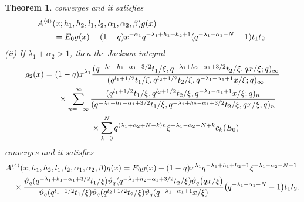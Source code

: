 \documentclass[12pt]{amsart}
\numberwithin{equation}{section}
\newtheorem{thm}{Theorem}[section]
\theoremstyle{definition}
\theoremstyle{remark}
\begin{document}
\begin{thm}
converges and it satisfies
  \begin{align}
    &A^{\langle 4 \rangle} (x; h_{1}, h_{2}, l_{1}, l_{2}, \alpha_{1}, \alpha_{2}, \beta) g (x) \label{eq:2qHnonh1} \\
    &\qquad = E_0 g (x) - (1 - q) x^{- \alpha_{1}}q^{ - \lambda _{1} + h_{1} + h_{2} + 1 }(q^{- \lambda _{1} - \alpha _{1} - N} - 1)t_{1}t_{2} . \notag
  \end{align}
(ii) If  $ \lambda _{1} + \alpha _{2}  > 1$, then the Jackson integral
  \begin{align*}
    &g _2 (x) = (1 - q) x^{ \lambda _{1} } \frac{(q^{-  \lambda _{1} + h_{1} - \alpha _{1} + 3/2}t_{1}/\xi, q^{ - \lambda _{1} +h_{2} - \alpha _{1} + 3/2}t_{2}/\xi, qx/\xi; q)_{\infty}}{(q^{l_{1} + 1/2}t_{1}/\xi, q^{l_{2} + 1/2}t_{2}/\xi, q^{- \lambda _{1} - \alpha _{1} + 1}x/\xi; q)_{\infty}} \\
    & \qquad \qquad \times \sum_{n = -\infty}^{\infty} \frac{(q^{l_{1} + 1/2}t_{1}/\xi, q^{l_{2} + 1/2}t_{2}/\xi, q^{- \lambda _{1} - \alpha _{1} + 1 }x/\xi; q)_{n}}{(q^{- \lambda _{1} + h_{1} - \alpha _{1} + 3/2}t_{1}/\xi, q^{- \lambda _{1} + h_{2} - \alpha _{1} + 3/2}t_{2}/\xi, qx/\xi; q)_{n}} \\
    & \qquad \qquad \qquad \qquad \times \sum_{k = 0}^{N} q^{( \lambda _{1}  + \alpha_{2}+ N -k)n} \xi^{- \lambda _{1}  -\alpha_{2} - N + k} c_{k}(E_0) \notag
  \end{align*}
converges and it satisfies
  \begin{align*}
    & A^{\langle 4 \rangle} (x; h_{1}, h_{2}, l_{1}, l_{2}, \alpha_{1}, \alpha_{2}, \beta) g(x) = E_0 g(x) - (1 - q) x^{ \lambda _{1} } q^{ - \lambda _{1} + h_{1} + h_{2} + 1} \xi^{- \lambda _{1} -\alpha_{2}  - N  -1}  \\
    & \quad \times \frac{\vartheta _q (q^{- \lambda _{1} + h_{1} - \alpha _{1} + 3/2}t_{1}/\xi) \vartheta _q (q^{- \lambda _{1} + h_{2} - \alpha _{1} + 3/2}t_{2}/\xi) \vartheta_{q} \big(qx/\xi \big)}{\vartheta _q (q^{l_{1} + 1/2}t_{1}/\xi) \vartheta _q (q^{l_{2} + 1/2}t_{2}/\xi) \vartheta_{q} (q^{- \lambda _{1} - \alpha _{1} + 1 } x/\xi )} \big( q^{ - \lambda _{1} - \alpha _{1} -N} - 1 \big) t_{1} t_{2} . \notag

\end{align*}
\end{thm}
\end{document}
